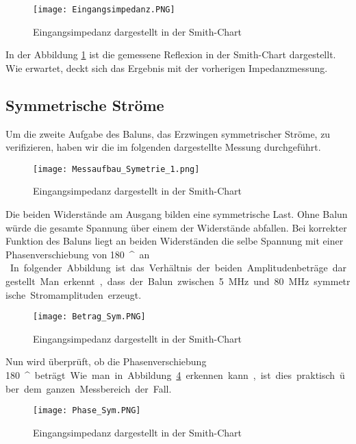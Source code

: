 \begin{figure}[H]
	\centering
	\texttt{[image: Eingangsimpedanz.PNG]}
	\caption{Eingangsimpedanz dargestellt in der Smith-Chart}\label{fig:Eingangsimpedanz}
\end{figure}

In der Abbildung \ref{fig:Eingangsimpedanz} ist die gemessene Reflexion in der Smith-Chart dargestellt. Wie erwartet, deckt sich das Ergebnis mit der vorherigen Impedanzmessung.
\newpage
\subsection{Symmetrische Ströme}

Um die zweite Aufgabe des Baluns, das Erzwingen symmetrischer Ströme, zu verifizieren, haben wir die im folgenden dargestellte Messung durchgeführt.
\begin{figure}[H]
	\centering
	\texttt{[image: Messaufbau\_Symetrie\_1.png]}
	\caption{Eingangsimpedanz dargestellt in der Smith-Chart}\label{fig:mess_sym}
\end{figure}
Die beiden Widerstände am Ausgang bilden eine symmetrische Last. Ohne Balun würde die gesamte Spannung über einem der Widerstände abfallen. Bei korrekter Funktion des Baluns liegt an beiden Widerständen die selbe Spannung mit einer Phasenverschiebung von \SI{180}{^\circ} an.\\
In folgender Abbildung ist das Verhältnis der beiden Amplitudenbeträge dargestellt. Man erkennt, dass der Balun zwischen \SI{5}{MHz} und \SI{80}{MHz} symmetrische Stromamplituden erzeugt.

\begin{figure}[H]
	\centering
	\texttt{[image: Betrag\_Sym.PNG]}
	\caption{Eingangsimpedanz dargestellt in der Smith-Chart}\label{fig:Betrag_sym}
\end{figure}
Nun wird überprüft, ob die Phasenverschiebung \SI{180}{^\circ} beträgt. Wie man in Abbildung \ref{fig:Phase_sym} erkennen kann, ist dies praktisch über dem ganzen Messbereich der Fall.
\begin{figure}[H]
	\centering
	\texttt{[image: Phase\_Sym.PNG]}
	\caption{Eingangsimpedanz dargestellt in der Smith-Chart}\label{fig:Phase_sym}
\end{figure}